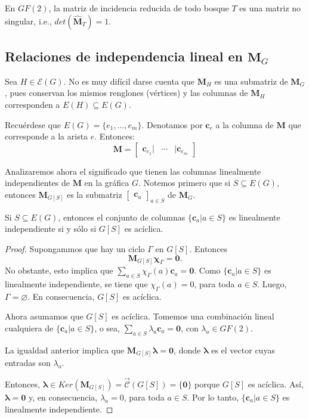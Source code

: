 \begin{prop} \label{prop:arbolesnosingulares}
En $GF(2)$, la matriz de incidencia reducida de todo bosque $T$ es una matriz no singular, i.e., $det(\widehat{\mathbf{M}}_{T}) = 1$.
\end{prop}


\subsection{Relaciones de independencia lineal en $\mathbf{M}_{G}$}

Sea $H \in \mathcal{E}(G)$. No es muy difícil darse cuenta que $\mathbf{M}_{H}$ es una submatriz de $\mathbf{M}_{G}$, pues conservan los mismos renglones (vértices) y las columnas de $\mathbf{M}_{H}$ corresponden a $E(H)\subseteq E(G)$.

Recuérdese que $E(G)=\{e_{1}, \ldots, e_{m}\}$. Denotamos por $\mathbf{c}_{e}$ a la columna de $\mathbf{M}$ que corresponde a la arista $e$. Entonces:
$$
\mathbf{M}=\begin{bmatrix}
\mathbf{c}_{e_{1}} |& \cdots & |\mathbf{c}_{e_{m}} 
\end{bmatrix}
$$

Analizaremos ahora el significado que tienen las columnas linealmente independientes de $\mathbf{M}$ en la gráfica $G$. Notemos primero que si $S \subseteq E(G)$, entonces $\mathbf{M}_{G[S]}$ es la submatriz $\begin{bmatrix}
\mathbf{c}_{a}  
\end{bmatrix}_{a \in S}$ de $\mathbf{M}_{G}$.

\begin{teo}\label{teo:liaciclicas} Si $S \subseteq E(G)$, entonces
el conjunto de columnas $\{\mathbf{c}_{a} | a \in S\}$ es linealmente independiente si y sólo si $G[S]$ es acíclica.
\end{teo}

\begin{proof}
Supongammos que hay un ciclo $\Gamma$ en $G[S]$. Entonces $$\mathbf{M}_{G[S]}\boldsymbol{\chi}_{\Gamma}= \mathbf{0}.$$ No obstante, esto implica que $\sum_{a \in S} \chi_{\Gamma}(a)\mathbf{c}_{a} = \mathbf{0}$. Como $\{\mathbf{c}_{a} | a \in S\}$ es linealmente independiente, se tiene que $\chi_{\Gamma}(a) = 0$, para toda $a \in S$. Luego, $\Gamma = \varnothing$. En consecuencia, $G[S]$ es acíclica.

Ahora asumamos que $G[S]$ es acíclica. Tomemos una combinación lineal cualquiera de $\{\mathbf{c}_{a} | a \in S\}$, o sea, $\sum_{a \in S} \lambda_{a} \mathbf{c}_{a} = \mathbf{0}$, con $\lambda_{a} \in GF(2)$.

La igualdad anterior implica que $\mathbf{M}_{G[S]}\boldsymbol{\lambda} = \mathbf{0}$, donde $\boldsymbol{\lambda}$ es el vector cuyas entradas son $\lambda_{a}$.

Entonces, $\boldsymbol{\lambda} \in Ker(\mathbf{M}_{G[S]}) = \overrightarrow{\mathcal{C}}(G[S]) = \{\mathbf{0}\}$ porque $G[S]$ es acíclica. Así, $\boldsymbol{\lambda} = \mathbf{0}$ y, en consecuencia, $\lambda_{a} = 0$, para toda $a \in S$. Por lo tanto, $\{\mathbf{c}_{a} | a \in S\}$ es linealmente independiente.

\end{proof}
 
